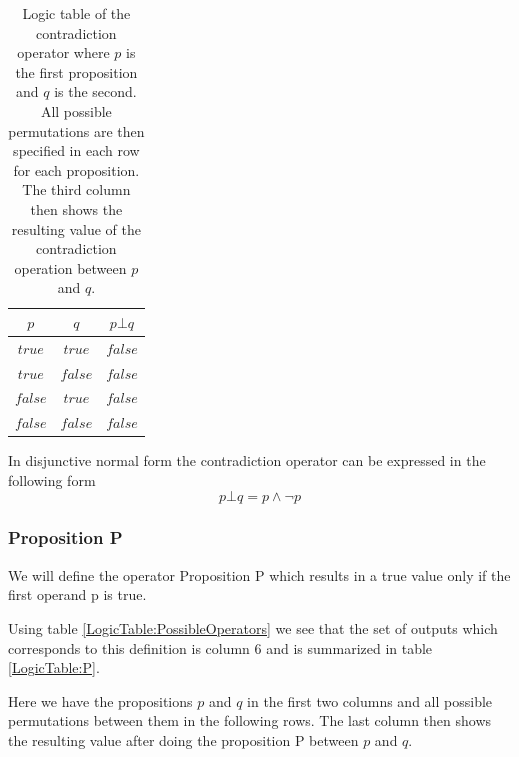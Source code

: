         \begin{table}[h!]
            \centering
            \begin{tabular}{|c|c|c|}
            	\hline
            	  $p$   &   $q$   & $p \bot q$ \\ \hline
            	$true$  & $true$  &  $false$   \\ \hline
            	$true$  & $false$ &  $false$   \\ \hline
            	$false$ & $true$  &  $false$   \\ \hline
            	$false$ & $false$ &  $false$   \\ \hline
            \end{tabular}
            \caption{Logic table of the contradiction operator where $p$ is the first proposition and $q$ is the second. All possible permutations are then specified in each row for each proposition. The third column then shows the resulting value of the contradiction operation between $p$ and $q$.}
            \label{LogicTable:contradiction}
        \end{table}
        
        In disjunctive normal form the contradiction operator can be expressed in the following form
        \begin{equation}
            p \bot q = p \wedge \neg p
        \end{equation}
    
    \subsubsection{Proposition P}
        We will define the operator Proposition P which results in a true value only if the first operand p is true.
        
        Using table \ref{LogicTable:PossibleOperators} we see that the set of outputs which corresponds to this definition is column 6 and is summarized in table \ref{LogicTable:P}.
        
        Here we have the propositions $p$ and $q$ in the first two columns and all possible permutations between them in the following rows. The last column then shows the resulting value after doing the proposition P between $p$ and $q$.
        
